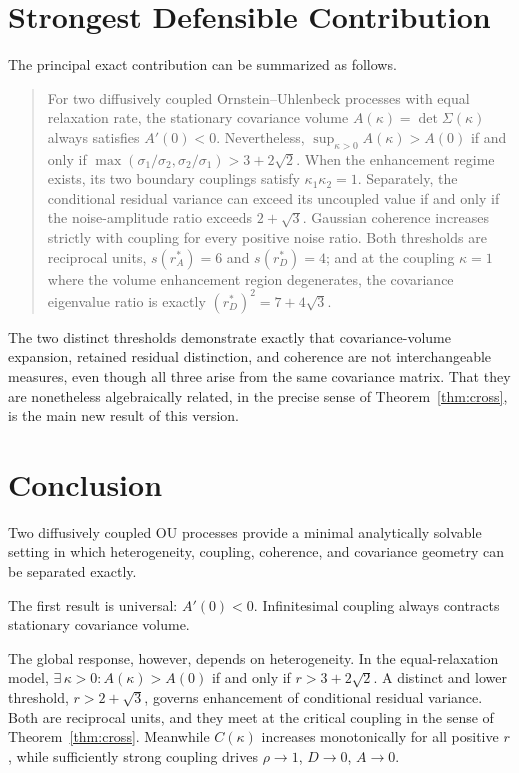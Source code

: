 \documentclass[11pt]{article}
\theoremstyle{plain}
\theoremstyle{remark}
\newcommand{\rA}{r_A^{*}}
\newcommand{\rD}{r_D^{*}}
\begin{document}
\section{Strongest Defensible Contribution}

The principal exact contribution can be summarized as follows.

\begin{quote}
For two diffusively coupled Ornstein--Uhlenbeck processes with equal relaxation rate, the
stationary covariance volume $A(\kappa)=\det\Sigma(\kappa)$ always satisfies $A'(0)<0$.
Nevertheless, $\sup_{\kappa>0}A(\kappa)>A(0)$ if and only if
$\max(\sigma_1/\sigma_2,\sigma_2/\sigma_1)>3+2\sqrt2$. When the enhancement regime exists, its
two boundary couplings satisfy $\kappa_1\kappa_2=1$. Separately, the conditional residual
variance can exceed its uncoupled value if and only if the noise-amplitude ratio exceeds
$2+\sqrt3$. Gaussian coherence increases strictly with coupling for every positive noise ratio.
Both thresholds are reciprocal units, $s(\rA)=6$ and $s(\rD)=4$; and at the coupling
$\kappa=1$ where the volume enhancement region degenerates, the covariance eigenvalue ratio is
exactly $(\rD)^2=7+4\sqrt3$.
\end{quote}

The two distinct thresholds demonstrate exactly that covariance-volume expansion, retained
residual distinction, and coherence are not interchangeable measures, even though all three
arise from the same covariance matrix. That they are nonetheless algebraically related, in the
precise sense of Theorem~\ref{thm:cross}, is the main new result of this version.

\section{Conclusion}

Two diffusively coupled OU processes provide a minimal analytically solvable setting in which
heterogeneity, coupling, coherence, and covariance geometry can be separated exactly.

The first result is universal: $A'(0)<0$. Infinitesimal coupling always contracts stationary
covariance volume.

The global response, however, depends on heterogeneity. In the equal-relaxation model,
$\exists\,\kappa>0:A(\kappa)>A(0)$ if and only if $r>3+2\sqrt2$. A distinct and lower
threshold, $r>2+\sqrt3$, governs enhancement of conditional residual variance. Both are
reciprocal units, and they meet at the critical coupling in the sense of
Theorem~\ref{thm:cross}. Meanwhile $C(\kappa)$ increases monotonically for all positive $r$,
while sufficiently strong coupling drives $\rho\to1$, $D\to0$, $A\to0$.
\end{document}
